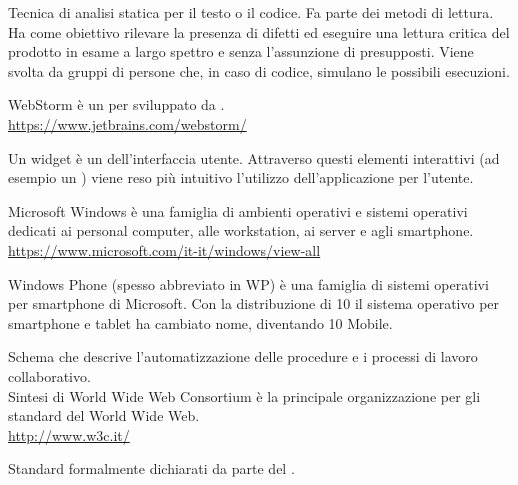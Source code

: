 Tecnica di analisi statica per il testo o il codice. Fa parte dei metodi di lettura. Ha come obiettivo rilevare la presenza di difetti ed eseguire una lettura critica del prodotto in esame a largo spettro e senza l’assunzione di presupposti. Viene svolta da gruppi di persone che, in caso di codice, simulano le possibili esecuzioni.

WebStorm è un  per  sviluppato da .\\
\url{https://www.jetbrains.com/webstorm/}

Un widget è un  dell'interfaccia utente. Attraverso questi elementi interattivi (ad esempio un ) viene reso più intuitivo l'utilizzo dell'applicazione per l'utente.

Microsoft Windows è una famiglia di ambienti operativi e sistemi operativi dedicati ai personal computer, alle workstation, ai server e agli smartphone.\\
\url{https://www.microsoft.com/it-it/windows/view-all}

Windows Phone (spesso abbreviato in WP) è una famiglia di sistemi operativi per smartphone di Microsoft. Con la distribuzione di  10 il sistema operativo per smartphone e tablet ha cambiato nome, diventando  10 Mobile.

Schema che descrive l’automatizzazione delle procedure e i processi di lavoro collaborativo.\\

Sintesi di World Wide Web Consortium è la principale organizzazione per gli standard del World Wide Web.\\
\url{http://www.w3c.it/}

Standard formalmente dichiarati da parte del .\\
\clearpage

